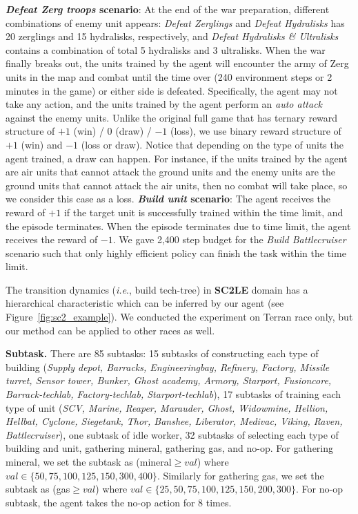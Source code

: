 \documentclass{article} \usepackage{iclr2020_conference,times}
\makeatletter
\newcommand{\tb}{\textbf}
\DeclareRobustCommand\onedot{\futurelet\@let@token\@onedot}
\def\onedot{.}
\def\ie{\emph{i.e}\onedot} \def\Ie{\emph{I.e}\onedot}
\makeatother
\begin{document}
\tb{\textit{Defeat Zerg troops} scenario}: At the end of the war preparation, different combinations of enemy unit appears: \textit{Defeat Zerglings} and \textit{Defeat Hydralisks} has 20 zerglings and 15 hydralisks, respectively,
and \textit{Defeat Hydralisks \& Ultralisks} contains a combination of total 5 hydralisks and 3 ultralisks. 
When the war finally breaks out, the units trained by the agent will encounter the army of Zerg units
in the map and combat until the time over (240 environment steps or 2 minutes in the game) or either side is defeated. Specifically, the agent may not take any action, and the units trained by the agent perform an \textit{auto attack} against the enemy units. Unlike the original full game that has ternary reward
structure of $+1$ (win) / $0$ (draw) / $-1$ (loss), we use binary reward structure of $+1$ (win) and $-1$ (loss or draw).
Notice that depending on the type of units the agent trained, a draw can happen.
For instance, if the units trained by the agent are air units that cannot attack the ground units
and the enemy units are the ground units that cannot attack the air units, then no combat will take place, so
we consider this case as a loss.
\tb{\textit{Build unit} scenario}: The agent receives the reward of $+1$ if the target unit is successfully trained within the time limit, and the episode terminates. When the episode terminates due to time limit, the agent receives the reward of $-1$. We gave 2,400 step budget for the \textit{Build Battlecruiser} scenario such that only highly efficient policy can finish the task within the time limit.

The transition dynamics (\ie, build tech-tree) in \tb{SC2LE} domain has a hierarchical characteristic which can be inferred by our \NSGI agent (see Figure~\ref{fig:sc2_example}).
We conducted the experiment on Terran race only, but our method can be applied to other races as well.

\textbf{Subtask.}
There are 85 subtasks: 15 subtasks of constructing each type of building (\textit{Supply depot, Barracks, Engineeringbay, Refinery, Factory, Missile turret, Sensor tower, Bunker, Ghost academy, Armory, Starport, Fusioncore, Barrack-techlab, Factory-techlab, Starport-techlab}), 17 subtasks of training each type of unit (\textit{SCV, Marine, Reaper, Marauder, Ghost, Widowmine, Hellion, Hellbat, Cyclone, Siegetank, Thor, Banshee, Liberator, Medivac, Viking, Raven, Battlecruiser}), one subtask of idle worker, 32 subtasks of selecting each type of building and unit, gathering mineral, gathering gas, and no-op. For gathering mineral, we set the subtask as (mineral$\geq val$) where $val \in \{50, 75, 100, 125, 150, 300, 400\}$. Similarly for gathering gas, we set the subtask as (gas$\geq val$) where $val \in \{25, 50, 75, 100, 125, 150, 200, 300\}$. For no-op subtask, the agent takes the no-op action for 8 times. 
\end{document}
